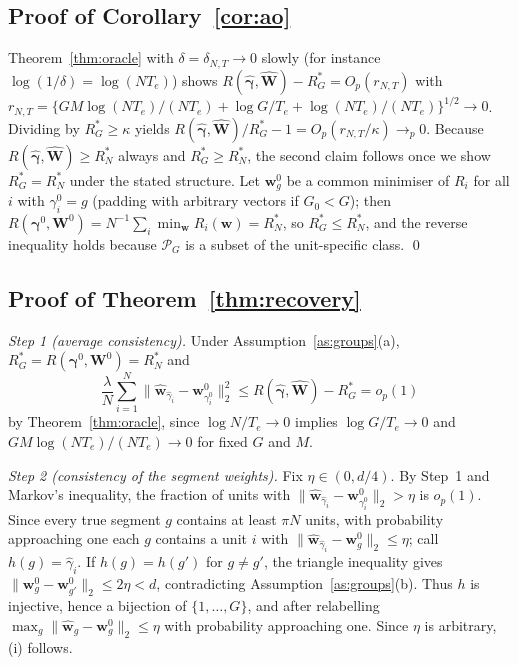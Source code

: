 \subsection*{Proof of Corollary~\ref{cor:ao}}

Theorem~\ref{thm:oracle} with $\delta=\delta_{N,T}\to0$ slowly (for instance $\log(1/\delta)=\log(NT_e)$) shows $R(\widehat{\bm\gamma},\widehat{\bm W})-R^*_G=O_p(r_{N,T})$ with
$r_{N,T}=\{GM\log(NT_e)/(NT_e)+\log G/T_e+\log(NT_e)/(NT_e)\}^{1/2}\to0$.
Dividing by $R^*_G\ge\kappa$ yields $R(\widehat{\bm\gamma},\widehat{\bm W})/R^*_G-1=O_p(r_{N,T}/\kappa)\to_p0$.
Because $R(\widehat{\bm\gamma},\widehat{\bm W})\ge R^*_N$ always and $R^*_G\ge R^*_N$, the second claim follows once we show $R^*_G=R^*_N$ under the stated structure.
Let $\bm w^0_g$ be a common minimiser of $R_i$ for all $i$ with $\gamma^0_i=g$ (padding with arbitrary vectors if $G_0<G$); then
$R(\bm\gamma^0,\bm W^0)=N^{-1}\sum_i\min_{\bm w}R_i(\bm w)=R^*_N$, so $R^*_G\le R^*_N$, and the reverse inequality holds because $\mathcal P_G$ is a subset of the unit-specific class. \qed

\subsection*{Proof of Theorem~\ref{thm:recovery}}

\emph{Step 1 (average consistency).}
Under Assumption~\ref{as:groups}(a), $R^*_G=R(\bm\gamma^0,\bm W^0)=R^*_N$ and
\[
\frac\lambda N\sum_{i=1}^N\big\|\widehat{\bm w}_{\widehat\gamma_i}-\bm w^0_{\gamma^0_i}\big\|_2^2\le R(\widehat{\bm\gamma},\widehat{\bm W})-R^*_G=o_p(1)
\]
by Theorem~\ref{thm:oracle}, since $\log N/T_e\to0$ implies $\log G/T_e\to0$ and $GM\log(NT_e)/(NT_e)\to0$ for fixed $G$ and $M$.

\emph{Step 2 (consistency of the segment weights).}
Fix $\eta\in(0,d/4)$.
By Step~1 and Markov's inequality, the fraction of units with $\|\widehat{\bm w}_{\widehat\gamma_i}-\bm w^0_{\gamma^0_i}\|_2>\eta$ is $o_p(1)$.
Since every true segment $g$ contains at least $\pi N$ units, with probability approaching one each $g$ contains a unit $i$ with $\|\widehat{\bm w}_{\widehat\gamma_i}-\bm w^0_g\|_2\le\eta$; call $h(g)=\widehat\gamma_i$.
If $h(g)=h(g')$ for $g\ne g'$, the triangle inequality gives $\|\bm w^0_g-\bm w^0_{g'}\|_2\le2\eta<d$, contradicting Assumption~\ref{as:groups}(b).
Thus $h$ is injective, hence a bijection of $\{1,\dots,G\}$, and after relabelling $\max_g\|\widehat{\bm w}_g-\bm w^0_g\|_2\le\eta$ with probability approaching one.
Since $\eta$ is arbitrary, (i) follows.

